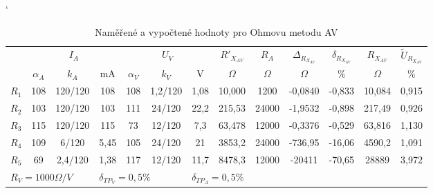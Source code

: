 \documentclass[a4paper, czech]{article}
\begin{document}
\begin{table}[H]
    \catcode`
    \centering
    \caption{Naměřené a vypočtené hodnoty pro Ohmovu metodu AV}
    \begin{tabular}{lcccccccccccc}
        \toprule
        \multirow{2}{*}{} & \multicolumn{3}{c}{$I_A$} & \multicolumn{3}{c}{$U_V$} & $R'_{X_{AV}}$ & $R_A$ & $\Delta_{R_{X_{AV}}}$ & $\delta_{R_{X_{AV}}}$ & $R_{X_{AV}}$ & $\tilde{U}_{R_{X_{AV}}}$ \\
        \cmidrule(rl){2-4}
        \cmidrule(rl){5-7}
        \cmidrule(rl){8-8}
        \cmidrule(rl){9-9}
        \cmidrule(rl){10-10}
        \cmidrule(rl){11-11}
        \cmidrule(rl){12-12}
        \cmidrule(rl){13-13}
        & $\alpha_A$   & $k_A$       & mA     & $\alpha_V$    & $k_V$       & V     & $\Omega$         & $\Omega$    & $\Omega$               & \%              & $\Omega$        & \%          \\
        \midrule
        $R_1$                & 108   & 120/120  & 108   & 108   & 1,2/120  & 1,08  & 10,000    & 1200  & -0,0840         & -0,833          & 10,084   & 0,915       \\
        $R_2$                & 103   & 120/120  & 103   & 111   & 24/120   & 22,2  & 215,53    & 24000 & -1,9532         & -0,898          & 217,49   & 0,926       \\
        $R_3$                & 115   & 120/120  & 115   & 73    & 12/120   & 7,3   & 63,478    & 12000 & -0,3376         & -0,529          & 63,816   & 1,130       \\
        $R_4$                & 109   & 6/120    & 5,45  & 105   & 24/120   & 21    & 3853,2    & 24000 & -736,95         & -16,06          & 4590,2   & 1,091       \\
        $R_5$                & 69    & 2,4/120  & 1,38  & 117   & 12/120   & 11,7  & 8478,3    & 12000 & -20411          & -70,65          & 28889    & 3,972      \\
        \bottomrule
        \multicolumn{3}{l}{$R_V = 1000 \Omega \slash V$} & \multicolumn{3}{l}{$\delta_{TP_V} = 0,5\%$} & \multicolumn{3}{l}{$\delta_{TP_A} = 0,5\%$} 
    \end{tabular}
\end{table}
\end{document}
